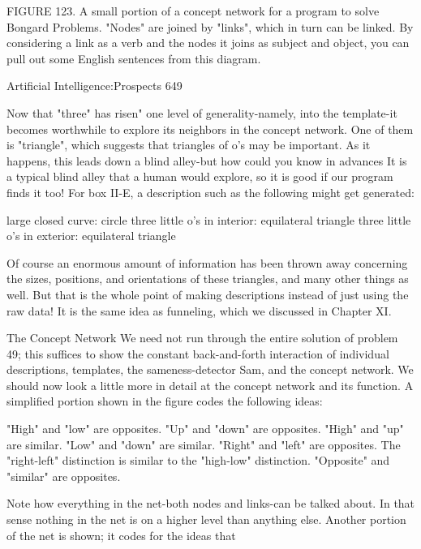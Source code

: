    FIGURE 123. A small portion of a concept network for a program to solve
   Bongard Problems. "Nodes" are joined by "links", which in turn can be linked. By
   considering a link as a verb and the nodes it joins as subject and object, you can
   pull out some English sentences from this diagram.



Artificial Intelligence:Prospects                                                   649

   Now that "three" has risen" one level of generality-namely, into the template-it
   becomes worthwhile to explore its neighbors in the concept network. One of them
   is "triangle", which suggests that triangles of o's may be important. As it happens,
   this leads down a blind alley-but how could you know in advances It is a typical
   blind alley that a human would explore, so it is good if our program finds it too!
   For box II-E, a description such as the following might get generated:

   large closed curve: circle
   three little o's in interior: equilateral triangle
   three little o's in exterior: equilateral triangle

   Of course an enormous amount of information has been thrown away concerning
   the sizes, positions, and orientations of these triangles, and many other things as
   well. But that is the whole point of making descriptions instead of just using the
   raw data! It is the same idea as funneling, which we discussed in Chapter XI.

                                 The Concept Network
   We need not run through the entire solution of problem 49; this suffices to show
   the constant back-and-forth interaction of individual descriptions, templates, the
   sameness-detector Sam, and the concept network. We should now look a little
   more in detail at the concept network and its function. A simplified portion shown
   in the figure codes the following ideas:

       "High" and "low" are opposites.
       "Up" and "down" are opposites.
       "High" and "up" are similar.
       "Low" and "down" are similar.
       "Right" and "left" are opposites.
       The "right-left" distinction is similar to the "high-low" distinction.
       "Opposite" and "similar" are opposites.

   Note how everything in the net-both nodes and links-can be talked about. In that
   sense nothing in the net is on a higher level than anything else. Another portion of
   the net is shown; it codes for the ideas that

